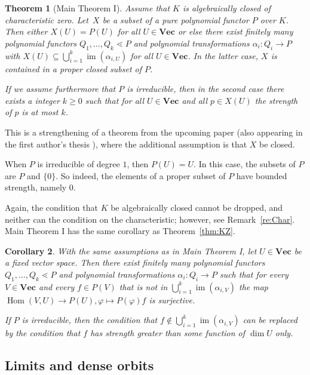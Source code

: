 \documentclass{amsart}
\theoremstyle{plain}
\newtheorem{thm}{Theorem}[subsection]
\newtheorem{cor}[thm]{Corollary}
\theoremstyle{definition}
\DeclareMathOperator{\im}{im}
\renewcommand{\phi}{\varphi}
\DeclareMathOperator{\Hom}{Hom}
\renewcommand{\Vec}{\mathbf{Vec}}
\begin{document}
\begin{thm}[Main Theorem I] \label{thm:MainI}
Assume that $K$ is algebraically closed of characteristic zero. Let~$X$ be a subset of a pure polynomial functor $P$ over $K$. Then either $X(U)=P(U)$ for all $U \in \Vec$ or
else there exist finitely many polynomial functors $Q_1,\ldots,Q_k\lessdot P$ and polynomial transformations $\alpha_i\colon Q_i \to P$ with $X(U) \subseteq \bigcup_{i=1}^k \im(\alpha_{i,U})$ for all $U\in\Vec$. In the latter case, $X$ is contained in a proper closed subset of $P$.

If we assume furthermore that $P$ is irreducible, then in the second
case there exists a integer $k\geq 0$ such that for all $U \in \Vec$
and all $p \in X(U)$ the strength of $p$ is at most $k$.
\end{thm}

This is a strengthening of a theorem from the upcoming paper \cite{BDES:geometrypolyrep} (also appearing in the first author's thesis \cite[Theorem 4.2.5]{B:thesis}), where the additional
assumption is that $X$ be closed.

\begin{re}
When $P$ is irreducible of degree $1$, then $P(U)=U$. In this case, the subsets of $P$ are $P$ and $\{0\}$. So indeed, the elements of a proper subset of $P$ have bounded strength, namely $0$.
\end{re}

Again, the condition that $K$ be algebraically closed cannot be dropped,
and neither can the condition on the characteristic; however, see
Remark~\ref{re:Char}. Main Theorem I has the same corollary as
Theorem~\ref{thm:KZ}.

\begin{cor} \label{cor:Surjective}
With the same assumptions as in Main Theorem I, let $U\in\Vec$ be a fixed vector space. Then there exist finitely many polynomial functors $Q_1,\ldots,Q_k\lessdot P$ and polynomial transformations $\alpha_i\colon Q_i \to P$ such that for every $V \in \Vec$ and
every $f \in P(V)$ that is {\em not} in $\bigcup_{i=1}^k \im(\alpha_{i,V})$
the map $\Hom(V,U) \to P(U), \phi \mapsto P(\phi)f$ is surjective.

If $P$ is irreducible, then the condition that $f \not \in\bigcup_{i=1}^k \im(\alpha_{i,V})$
can be replaced by the condition that $f$ has strength greater than some
function of $\dim U$ only.
\end{cor}

\subsection{Limits and dense orbits}
\end{document}
